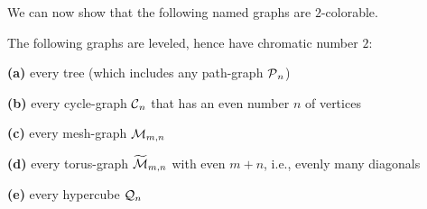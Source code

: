 We can now show that the following named graphs are $2$-colorable.

\begin{corol}
\label{thm:list-2-colorables}
The following graphs are leveled, hence have chromatic number $2$:

\smallskip

{\bf (a)}
every tree (which includes any path-graph $\mbox{$\cal P$}_n$)

\smallskip

{\bf (b)}
every cycle-graph $\mbox{$\cal C$}_n$ that has an even number $n$ of vertices

\smallskip

{\bf (c)}
every mesh-graph $\mbox{$\cal M$}_{m,n}$

\smallskip

{\bf (d)}
every torus-graph $\widetilde{\mbox{$\cal M$}}_{m,n}$ with even $m+n$, i.e., evenly many diagonals

\smallskip

{\bf (e)}
every hypercube $\mbox{$\cal Q$}_n$
\end{corol}

